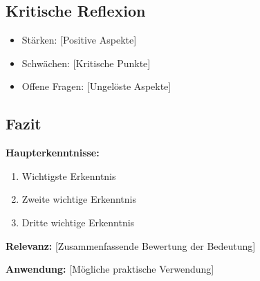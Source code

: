 \documentclass[a4paper,12pt]{article}
\begin{document}
\subsection{Kritische Reflexion}

\begin{itemize}
    \item Stärken: [Positive Aspekte]
    \item Schwächen: [Kritische Punkte]
    \item Offene Fragen: [Ungelöste Aspekte]
\end{itemize}

\subsection{Fazit}

\textbf{Haupterkenntnisse:}

\begin{enumerate}
    \item Wichtigste Erkenntnis
    \item Zweite wichtige Erkenntnis
    \item Dritte wichtige Erkenntnis
\end{enumerate}

\textbf{Relevanz:} [Zusammenfassende Bewertung der Bedeutung]

\textbf{Anwendung:} [Mögliche praktische Verwendung]

\printbibliography[
    title=Literaturverzeichnis,
    heading=bibintoc
]
\end{document}

